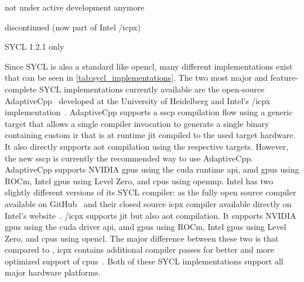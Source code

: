 \begin{table}[]
\begin{threeparttable}[b]
\begin{tblr}
        \end{tblr}
        \begin{tablenotes}
            \item[1] not under active development anymore
            \item[2] discontinued (now part of Intel \dpcpp/icpx)
            \item[*] SYCL 1.2.1 only
        \end{tablenotes}
    \end{threeparttable}
    \caption{%
        The available SYCL implementations. 
        Currently, three SYCL implementations are under active development, of which AdaptiveCpp and Intel's \dpcpp/icpx support the most hardware platforms. 
        The other SYCL implementations are not under active development anymore or officially discontinued (ComputeCpp). 
        Nevertheless, this table shows that SYCL supports a wide variety of different hardware platforms. 
    }
    \label{tab:sycl_implementations}
\end{table}

Since SYCL is also a standard like \gls{opencl}, many different implementations exist that can be seen in \autoref{tab:sycl_implementations}. 
The two most major and feature-complete SYCL implementations currently available are the open-source AdaptiveCpp~\cite{alpay_sycl_2020, alpay_one_2023, alpay_adaptivecppadaptivecpp_2025} developed at the University of Heidelberg and Intel's \dpcpp/icpx implementation~\cite{reinders_data_2021}. 
AdaptiveCpp supports a \gls{sscp} compilation flow using a generic target that allows a single compiler invocation to generate a single binary containing custom \gls{ir} that is at runtime \gls{jit} compiled to the used target hardware. 
It also directly supports \gls{aot} compilation using the respective targets. 
However, the new \gls{sscp} is currently the recommended way to use AdaptiveCpp. 
AdaptiveCpp supports NVIDIA \glspl{gpu} using the \gls{cuda} runtime \gls{api}, \gls{amd} \glspl{gpu} using ROCm, Intel \glspl{gpu} using Level Zero, and \glspl{cpu} using \gls{openmp}. 
Intel has two slightly different versions of its SYCL compiler: \dpcpp as the fully open source compiler available on GitHub~\cite{noauthor_intelllvm_2025} and their closed source icpx compiler available directly on Intel's website~\cite{intel_compile_2025}. 
\dpcpp/icpx supports \gls{jit} but also \gls{aot} compilation. 
It supports NVIDIA \glspl{gpu} using the \gls{cuda} driver \gls{api}, \gls{amd} \glspl{gpu} using ROCm, Intel \glspl{gpu} using Level Zero, and \glspl{cpu} using \gls{opencl}. 
The major difference between these two is that compared to \dpcpp, icpx contains additional compiler passes for better and more optimized support of \glspl{cpu}~\cite{brodman_dpc_2023}.
Both of these SYCL implementations support all major hardware platforms. 

